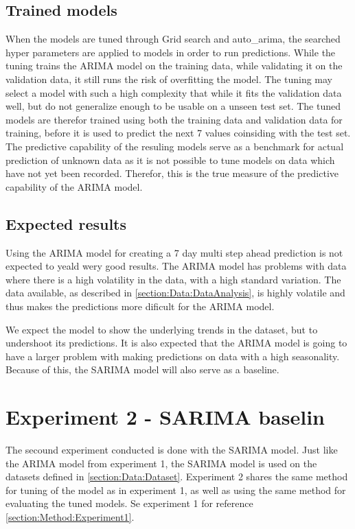 \subsection{Trained models}
When the models are tuned through Grid search and auto\_arima,
the searched hyper parameters are applied to models in order to run predictions.
While the tuning trains the ARIMA model on the training data, while validating it on the validation data,
it still runs the risk of overfitting the model.
The tuning may select a model with such a high complexity that while it fits the validation data well,
but do not generalize enough to be usable on a unseen test set.
The tuned models are therefor trained using both the training data and validation data for training,
before it is used to predict the next 7 values coinsiding with the test set.
The predictive capability of the resuling models serve as a benchmark for actual prediction
of unknown data as it is not possible to tune models on data which have not yet been recorded.
Therefor, this is the true measure of the predictive capability of the ARIMA model.


\subsection{Expected results}

Using the ARIMA model for creating a 7 day multi step ahead prediction is not expected to yeald wery good results.
The ARIMA model has problems with data where there is a high volatility in the data, with a high standard variation.
The data available, as described in \cref{section:Data:DataAnalysis},
is highly volatile and thus makes the predictions more dificult for the ARIMA model.

We expect the model to show the underlying trends in the dataset, but to
undershoot its predictions.
It is also expected that the ARIMA model is going to have a larger problem with making predictions on data with a high seasonality.
Because of this, the SARIMA model will also serve as a baseline.


\section{Experiment 2 - SARIMA baselin}
\label{section:Method:Experiment2}

The secound experiment conducted is done with the SARIMA model.
Just like the ARIMA model from experiment 1, the SARIMA model is used on the datasets defined in \cref{section:Data:Dataset}.
Experiment 2 shares the same method for tuning of the model as in experiment 1,
as well as using the same method for evaluating the tuned models.
Se experiment 1 for reference \cref{section:Method:Experiment1}.

